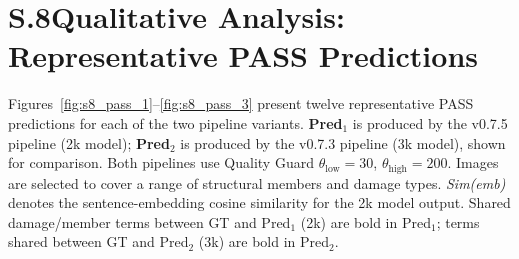 ﻿\documentclass[onecolumn]{article}
\begin{document}
\section*{S.8\quad Qualitative Analysis: Representative PASS Predictions}
\label{sec:s8}

Figures~\ref{fig:s8_pass_1}--\ref{fig:s8_pass_3} present twelve representative PASS predictions for each of the two pipeline variants.
\textbf{Pred$_1$} is produced by the v0.7.5 pipeline (2k model); \textbf{Pred$_2$} is produced by the v0.7.3 pipeline (3k model), shown for comparison.
Both pipelines use Quality Guard $\theta_{\mathrm{low}}=30$, $\theta_{\mathrm{high}}=200$.
Images are selected to cover a range of structural members and damage types.
\textit{Sim(emb)} denotes the sentence-embedding cosine similarity for the 2k model output.
Shared damage/member terms between GT and Pred$_1$ (2k) are bold in Pred$_1$; terms shared between GT and Pred$_2$ (3k) are bold in Pred$_2$.
\end{document}
